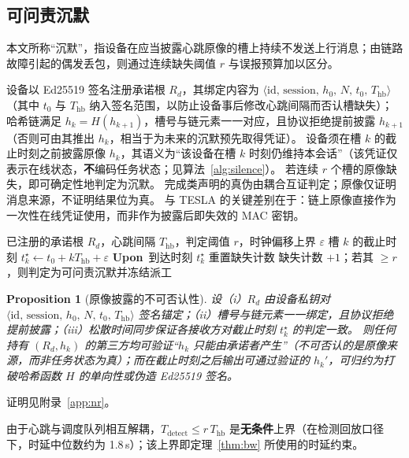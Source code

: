 \documentclass[manuscript,screen,review]{acmart}
\providecommand{\Upon}[1]{\State\textbf{Upon}~#1}
\providecommand{\EndUpon}{}
\newtheorem{proposition}{Proposition}
\begin{document}
\subsection{可问责沉默}
\label{sec:silence}

本文所称``沉默''，指设备在应当披露心跳原像的槽上持续不发送上行消息；由链路故障引起的偶发丢包，则通过连续缺失阈值 $r$ 与误报预算加以区分。

设备以 Ed25519 签名注册承诺根 $R_d$，其绑定内容为 $\langle\mathrm{id},\,\mathrm{session},\,h_0,\,N,\,t_0,\,T_{\mathrm{hb}}\rangle$（其中 $t_0$ 与 $T_{\mathrm{hb}}$ 纳入签名范围，以防止设备事后修改心跳间隔而否认槽缺失）；哈希链满足 $h_k=H(h_{k+1})$，槽号与链元素一一对应，且协议拒绝提前披露 $h_{k+1}$（否则可由其推出 $h_k$，相当于为未来的沉默预先取得凭证）。
设备须在槽 $k$ 的截止时刻之前披露原像 $h_k$，其语义为``该设备在槽 $k$ 时刻仍维持本会话''（该凭证仅表示在线状态，\textbf{不}编码任务状态；见算法~\ref{alg:silence}）。
若连续 $r$ 个槽的原像缺失，即可确定性地判定为沉默。
完成类声明的真伪由耦合互证判定；原像仅证明消息来源，不证明结果位为真。
与 TESLA 的关键差别在于：链上原像直接作为一次性在线凭证使用，而非作为披露后即失效的 MAC 密钥。

\begin{algorithm}[t]
\caption{可问责沉默（调度器侧）}
\label{alg:silence}
\begin{algorithmic}[1]
\Require 已注册的承诺根 $R_d$，心跳间隔 $T_{\mathrm{hb}}$，判定阈值 $r$，时钟偏移上界 $\varepsilon$
\State 槽 $k$ 的截止时刻 $t_k^\star \leftarrow t_0 + k T_{\mathrm{hb}}+\varepsilon$
\Upon{到达时刻 $t_k^\star$}
    \State 重置缺失计数
  \Else
    \State 缺失计数 ${+}\!1$；若其 $\ge r$，则判定为可问责沉默并冻结派工
  \EndIf
\EndUpon
\end{algorithmic}
\end{algorithm}

\begin{proposition}[原像披露的不可否认性]
\label{prop:nr}
设（i）$R_d$ 由设备私钥对 $\langle\mathrm{id},\,\mathrm{session},\,h_0,\,N,\,t_0,\,T_{\mathrm{hb}}\rangle$ 签名锚定；（ii）槽号与链元素一一绑定，且协议拒绝提前披露；（iii）松散时间同步保证各接收方对截止时刻 $t_k^\star$ 的判定一致。
则任何持有 $(R_d,h_k)$ 的第三方均可验证``$h_k$ 只能由承诺者产生''（不可否认的是原像来源，而非任务状态为真）；而在截止时刻之后输出可通过验证的 $h_k'$，可归约为打破哈希函数 $H$ 的单向性或伪造 Ed25519 签名。
\end{proposition}
证明见附录~\ref{app:nr}。

由于心跳与调度队列相互解耦，$T_{\mathrm{detect}}\le r\,T_{\mathrm{hb}}$ 是\textbf{无条件}上界（在检测回放口径下，时延中位数约为 1.8\,s）；该上界即定理~\ref{thm:bw} 所使用的时延约束。
\end{document}
